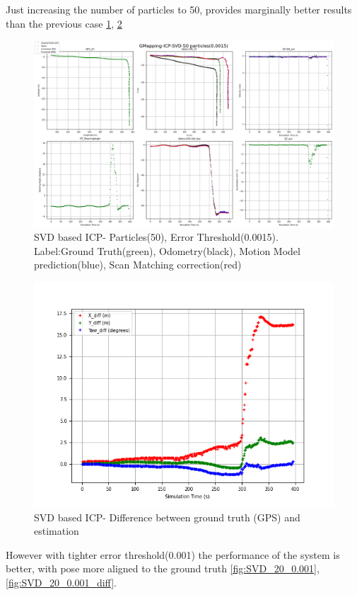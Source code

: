 \clearpage
Just increasing the number of particles to 50, provides marginally better results than the previous case \ref{fig:SVD_50_0.0015}, \ref{fig:SVD_50_0.0015_diff}
    \begin{figure}[h] 
        \includegraphics[height=0.6\textwidth]{images/GMapping-ICP-SVD-50 particles(0.0015)_PositionParameters.png}
        \caption{SVD based ICP- Particles(50), Error Threshold(0.0015). Label:Ground Truth(green), Odometry(black), Motion Model prediction(blue), Scan Matching correction(red)}
        \label{fig:SVD_50_0.0015}
    \end{figure}
    \begin{figure}[h]
        \includegraphics[height=0.4\textwidth]{images/GMapping-ICP-SVD-50 particles(0.0015)_True_vs_Crct.png}
        \caption{SVD based ICP- Difference between ground truth (GPS) and estimation}
        \label{fig:SVD_50_0.0015_diff}
    \end{figure}
\clearpage
However with tighter error threshold(0.001) the performance of the system is better, with pose more aligned to the ground truth \ref{fig:SVD_20_0.001}, \ref{fig:SVD_20_0.001_diff}.
